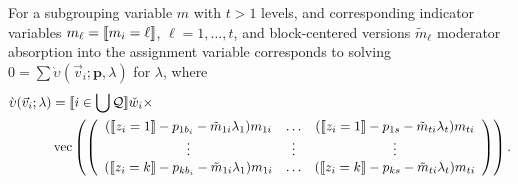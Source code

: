 \documentclass{article}
\DeclarePairedDelimiter{\indicator}{\llbracket}{\rrbracket}
\newcommand{\owt}[1][{[z_{i}]}]{\ensuremath{\check{w}_{i#1}}}
\newcommand{\absorbModeratorEF}{\grave{\upsilon}}
\begin{document}
For a subgrouping variable $m$ with $t>1$ levels, and corresponding
indicator variables $m_{\ell} =\indicator{m_{i}=\ell}$, $\ell=1,
\ldots, t$, and block-centered versions $\tilde{m}_{\ell}$  moderator absorption into the assignment variable
corresponds to solving $0 = \sum
\absorbModeratorEF(\vec{v}_{i}; \mathbf{p}, {\lambda})$ for $\lambda$, where
\begin{align}
    \absorbModeratorEF(\vec{v}_{i}; \mathbf{\lambda})
&=
                                                 \indicator{i \in \bigcup \mathcal{Q}} \owt[] \times \nonumber \\
  &\operatorname{vec}  \left(%
                                                 \left(
                                                 \begin{array}{ccc}
                                                   (\indicator{z_{i}=1}-p_{1b_{i}}-\tilde{m}_{1i}\lambda_{1})m_{1i}&\ldots&(\indicator{z_{i}=1}-p_{1s}-\tilde{m}_{ti}\lambda_{t})m_{ti}
                                                   \\
                                                   \vdots & \vdots &
                                                                     \vdots
                                                   \\
                                                   (\indicator{z_{i}=k}-p_{kb_{i}}
                                                   - \tilde{m}_{1i}\lambda_{1})m_{1i}&\ldots&(\indicator{z_{i}=k}-p_{ks}-\tilde{m}_{ti}\lambda_{t})m_{ti}\\                                                 \end{array}
  \right)%
  \right) .  \label{eq:17}
\end{align}
\end{document}
